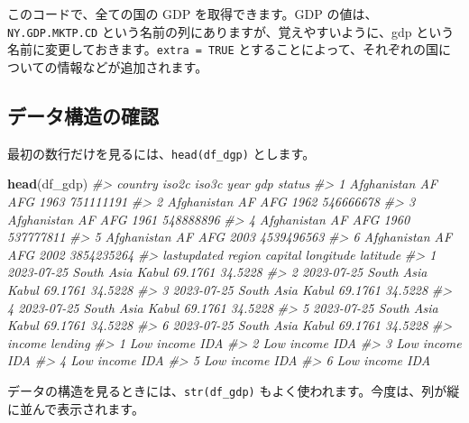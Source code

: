 \documentclass[
  xelatex, ja=standard]{bxjsbook}
\newenvironment{Shaded}{\begin{snugshade}}{\end{snugshade}}
\newcommand{\CommentTok}[1]{\textcolor[rgb]{0.56,0.35,0.01}{\textit{#1}}}
\newcommand{\FunctionTok}[1]{\textcolor[rgb]{0.13,0.29,0.53}{\textbf{#1}}}
\newcommand{\NormalTok}[1]{#1}
\theoremstyle{definition}
\theoremstyle{definition}
\theoremstyle{definition}
\theoremstyle{definition}
\theoremstyle{remark}
\begin{document}
このコードで、全ての国の GDP を取得できます。GDP の値は、\texttt{NY.GDP.MKTP.CD} という名前の列にありますが、覚えやすいように、gdp という名前に変更しておきます。\texttt{extra\ =\ TRUE} とすることによって、それぞれの国についての情報などが追加されます。

\hypertarget{ux30c7ux30fcux30bfux69cbux9020ux306eux78baux8a8d}{%
\subsection{データ構造の確認}\label{ux30c7ux30fcux30bfux69cbux9020ux306eux78baux8a8d}}

最初の数行だけを見るには、\texttt{head(df\_dgp)} とします。

\begin{Shaded}
\begin{Highlighting}[]
\FunctionTok{head}\NormalTok{(df\_gdp)}
\CommentTok{\#\textgreater{}       country iso2c iso3c year        gdp status}
\CommentTok{\#\textgreater{} 1 Afghanistan    AF   AFG 1963  751111191       }
\CommentTok{\#\textgreater{} 2 Afghanistan    AF   AFG 1962  546666678       }
\CommentTok{\#\textgreater{} 3 Afghanistan    AF   AFG 1961  548888896       }
\CommentTok{\#\textgreater{} 4 Afghanistan    AF   AFG 1960  537777811       }
\CommentTok{\#\textgreater{} 5 Afghanistan    AF   AFG 2003 4539496563       }
\CommentTok{\#\textgreater{} 6 Afghanistan    AF   AFG 2002 3854235264       }
\CommentTok{\#\textgreater{}   lastupdated     region capital longitude latitude}
\CommentTok{\#\textgreater{} 1  2023{-}07{-}25 South Asia   Kabul   69.1761  34.5228}
\CommentTok{\#\textgreater{} 2  2023{-}07{-}25 South Asia   Kabul   69.1761  34.5228}
\CommentTok{\#\textgreater{} 3  2023{-}07{-}25 South Asia   Kabul   69.1761  34.5228}
\CommentTok{\#\textgreater{} 4  2023{-}07{-}25 South Asia   Kabul   69.1761  34.5228}
\CommentTok{\#\textgreater{} 5  2023{-}07{-}25 South Asia   Kabul   69.1761  34.5228}
\CommentTok{\#\textgreater{} 6  2023{-}07{-}25 South Asia   Kabul   69.1761  34.5228}
\CommentTok{\#\textgreater{}       income lending}
\CommentTok{\#\textgreater{} 1 Low income     IDA}
\CommentTok{\#\textgreater{} 2 Low income     IDA}
\CommentTok{\#\textgreater{} 3 Low income     IDA}
\CommentTok{\#\textgreater{} 4 Low income     IDA}
\CommentTok{\#\textgreater{} 5 Low income     IDA}
\CommentTok{\#\textgreater{} 6 Low income     IDA}
\end{Highlighting}
\end{Shaded}

データの構造を見るときには、\texttt{str(df\_gdp)} もよく使われます。今度は、列が縦に並んで表示されます。
\end{document}
